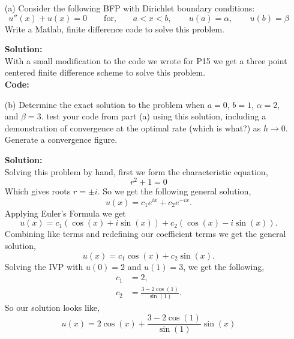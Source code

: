 \documentclass[12pt]{article}
\makeatletter
\theoremstyle{homework}
\newenvironment{exercise}[1]
{\def\@currentlabel{#1}\exercisecore}
{\endexercisecore}
\newcommand{\localhead}[1]{\par\smallskip\noindent\textbf{#1}\nobreak\\}%
\newcommand\solution{\localhead{Solution:}}
\makeatother
\begin{document}
\begin{exercise}{Problem P18}
  \begin{enumerate}
    \item[(a)] Consider the following BFP with Dirichlet boundary conditions:
    \begin{equation*}
      u''(x) + u(x) = 0 \qquad \text{for,}\qquad a < x < b, \qquad u(a) = \alpha,\qquad u(b) = \beta
    \end{equation*}
    Write a Matlab, finite difference code to solve this problem. 
    \solution With a small modification to the code we wrote for P15 we get a three point centered finite difference scheme 
    to solve this problem. \\
    \textbf{Code:}
    \begin{center}
      
    \end{center}

    \item[(b)] Determine the exact solution to the problem when $a = 0$, $b = 1$, $\alpha = 2$, and $\beta = 3$. 
    test your code from part (a) using this solution, including a demonstration of convergence at the optimal rate (which is what?)
    as $h \to 0$. Generate a convergence figure. 
    \solution Solving this problem by hand, first we form the characteristic equation, 
    \begin{equation*}
      r^2  + 1 = 0
    \end{equation*}
    Which gives roots $r = \pm i$. So we get the following general solution, 
    \begin{equation*}
      u(x) = c_1e^{ix} + c_2e^{-ix}. 
    \end{equation*} 
    Applying Euler's Formula we get 
    \begin{equation*}
      u(x) = c_1(\cos(x) + i\sin(x)) + c_2(\cos(x) - i\sin(x)).
    \end{equation*}
    Combining like terms and redefining our coefficient terms we get the general solution, 
    \begin{equation*}
      u(x) = c_1 \cos(x)  + c_2 \sin(x).
    \end{equation*}
    Solving the IVP with $u(0) = 2$ and $u(1) = 3$, we get the following, 
    \begin{align*}
      c_1 &= 2, \\
      c_2 &=  \frac{3 - 2\cos(1)}{\sin(1)}.
    \end{align*}
    So our solution looks like, 
    \begin{equation*}
      u(x) =  2\cos(x) + \frac{3 - 2\cos(1)}{\sin(1)}\sin(x)
    \end{equation*}


\end{enumerate}
\end{exercise}
\end{document}
